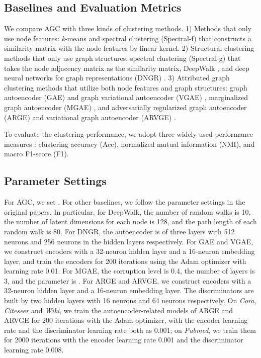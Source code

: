 \documentclass{article}
\begin{document}
\subsection{Baselines and Evaluation Metrics}
We compare AGC with three kinds of clustering methods. 1) Methods that only use node features: \emph{k}-means and spectral clustering (Spectral-f) that constructs a similarity matrix with the node features by linear kernel. 2) Structural clustering methods that only use graph structures: spectral clustering (Spectral-g) that takes the node adjacency matrix as the similarity matrix, DeepWalk \cite{perozzi2014deepwalk}, and deep neural networks for graph representations (DNGR) \cite{cao2016deep}. 3) Attributed graph clustering methods that utilize both node features and graph structures: graph autoencoder (GAE) and graph variational autoencoder (VGAE) \cite{kipf2016variational}, marginalized graph autoencoder (MGAE) \cite{wang2017mgae}, and adversarially regularized graph autoencoder (ARGE) and variational graph autoencoder (ARVGE) \cite{pan2018adversarially}.

To evaluate the clustering performance, we adopt three widely used performance measures \cite{Aggarwal14}: clustering accuracy (Acc), normalized mutual information (NMI), and macro F1-score (F1).



\subsection{Parameter Settings}
For AGC, we set . For other baselines, we follow the parameter settings in the original papers. In particular, for DeepWalk, the number of random walks is 10, the number of latent dimensions for each node is 128, and the path length of each random walk is 80. For DNGR, the autoencoder is of three layers with 512 neurons and 256 neurons in the hidden layers respectively. For GAE and VGAE, we construct encoders with a 32-neuron hidden layer and a 16-neuron embedding layer, and train the encoders for 200 iterations using the Adam optimizer with learning rate 0.01.
For MGAE, the corruption level  is 0.4, the number of layers is 3, and the parameter  is . For ARGE and ARVGE, we construct encoders with a 32-neuron hidden layer and a 16-neuron embedding layer. The discriminators are built by two hidden layers with 16 neurons and 64 neurons respectively. On \emph{Cora}, \emph{Citeseer} and \emph{Wiki}, we train the autoencoder-related models of ARGE and ARVGE for 200 iterations with the Adam optimizer, with the encoder learning rate and the discriminator learning rate both as 0.001; on \emph{Pubmed}, we train them for 2000 iterations with the encoder learning rate 0.001 and the discriminator learning rate 0.008.
\end{document}
